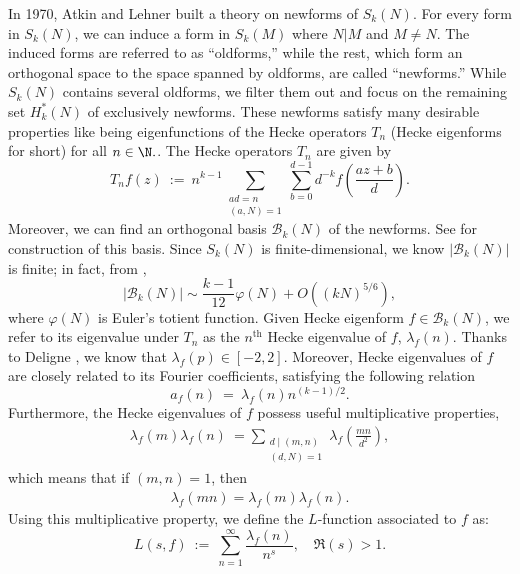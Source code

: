 \documentclass[11pt, reqno]{amsart}
\theoremstyle{definition}
\theoremstyle{remark}
\numberwithin{equation}{section}
\begin{document}
In 1970, Atkin and Lehner \cite{AL} built a theory on newforms of $S_k(N)$. For every form in $S_k(N)$, we can induce a form in $S_k(M)$ where $N|M$ and $M \neq N$. The induced forms are referred to as ``oldforms,'' while the rest, which form an orthogonal space to the space spanned by oldforms, are called ``newforms.'' While $S_k(N)$ contains several oldforms, we filter them out and focus on the remaining set $H^*_k(N)$ of exclusively newforms. These newforms satisfy many desirable properties like being eigenfunctions of the Hecke operators $T_n$ (Hecke eigenforms for short) for all $n \in \N.$. The Hecke operators $T_n$ are given by
\begin{equation}\label{eq:Hecke}
T_nf(z) \ := \ n^{k-1}\sum_{\substack{ad=n \\(a,N)=1}}\sum_{b=0}^{d-1}d^{-k}f\left(\frac{az+b}{d}\right) .
\end{equation} 
Moreover, we can find an orthogonal basis $\mathcal{B}_k(N)$ of the newforms. See \cite{ILS2} for construction of this basis.
Since $S_k(N)$ is finite-dimensional, we know $|\mathcal{B}_k(N)|$ is finite; in fact, from \cite[(2.73)]{ILS},
\begin{equation}
\left|\mathcal{B}_k(N)\right|\sim\frac{k-1}{12}\varphi(N)+O\left((kN)^{5/6}\right),
\end{equation} 
where $\varphi(N)$ is Euler's totient function. Given Hecke eigenform $f\in\mathcal{B}_k(N)$, we refer to its eigenvalue under $T_n$ as the $n^{\text{th}}$ Hecke eigenvalue of $f$, $\lambda_f(n)$. Thanks to Deligne \cite{Deligne1974}, we know that $\lambda_f(p)\in [-2,2]$. Moreover, Hecke eigenvalues of $f$ are closely related to its Fourier coefficients, satisfying the following relation 
\begin{equation}\label{eq:Fourier-Hecke}
    a_f(n) \ = \ \lambda_f(n)n^{(k-1)/2}.
\end{equation}
 Furthermore, the Hecke eigenvalues of $f$ possess useful multiplicative properties,
\begin{align}\label{eq:mult-prop}
\lambda_f(m)\lambda_f(n)\ =\sum_{\substack{d\mid(m,n)\\ (d,N)=1}}\lambda_f\left(\frac{mn}{d^2}\right),\end{align}
which means that if $(m,n)=1$, then
\begin{align}\lambda_f(mn)=\lambda_f(m)\lambda_f(n).
\end{align}
Using this multiplicative property, we define the $L$-function associated to $f$ as:
\begin{equation}
L(s,f) \ := \ \sum_{n=1}^{\infty}\frac{\lambda_f(n)}{n^s}, \quad \Re(s)>1.
\end{equation}
\end{document}
